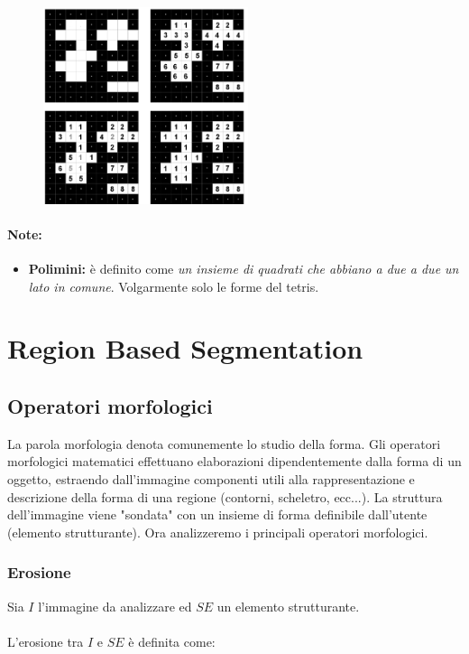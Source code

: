 \begin{figure}[H]
    \centering
    \includegraphics[width=6cm, keepaspectratio]{capitoli/immagini/imgs/fuzzy-selection.png}
\end{figure}

\paragraph{Note:}
\begin{itemize}
    \item \textbf{Polimini:} è definito come \textit{un insieme di quadrati che abbiano a due a due un lato in comune}. Volgarmente solo le forme del tetris.
\end{itemize}

\section{Region Based Segmentation}
\subsection{Operatori morfologici}

La parola morfologia denota comunemente lo studio della forma.
Gli operatori morfologici matematici effettuano elaborazioni dipendentemente dalla forma di un oggetto, estraendo
dall'immagine componenti utili alla rappresentazione e descrizione della forma di una regione (contorni, scheletro, ecc...).
La struttura dell'immagine viene "sondata" con un insieme di forma definibile dall'utente (elemento strutturante).
Ora analizzeremo i principali operatori morfologici.

\subsubsection{Erosione}

Sia $I$ l'immagine da analizzare ed $SE$ un elemento strutturante.
\\\\
L'erosione tra $I$ e $SE$ è definita come:

